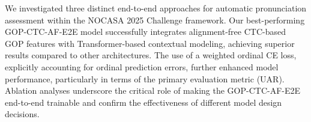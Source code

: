 \documentclass{article}
\begin{document}
We investigated three distinct end-to-end approaches for automatic pronunciation assessment within the NOCASA 2025 Challenge framework. Our best-performing GOP-CTC-AF-E2E model successfully integrates alignment-free CTC-based GOP features with Transformer-based contextual modeling, achieving superior results compared to other architectures. The use of a weighted ordinal CE loss, explicitly accounting for ordinal prediction errors, further enhanced model performance, particularly in terms of the primary evaluation metric (UAR). Ablation analyses underscore the critical role of making the GOP-CTC-AF-E2E end-to-end trainable and confirm the effectiveness of different model design decisions.






\end{document}
